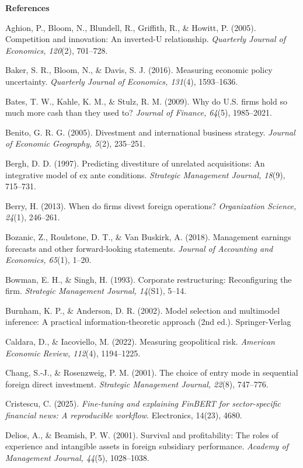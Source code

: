 \documentclass{article}
\begin{document}
\newpage

\textbf{References}

Aghion, P., Bloom, N., Blundell, R., Griffith, R., \& Howitt, P. (2005).
Competition and innovation: An inverted-U relationship. \emph{Quarterly
Journal of Economics, 120}(2), 701--728.

Baker, S. R., Bloom, N., \& Davis, S. J. (2016). Measuring economic
policy uncertainty. \emph{Quarterly Journal of Economics, 131}(4),
1593--1636.

Bates, T. W., Kahle, K. M., \& Stulz, R. M. (2009). Why do U.S. firms
hold so much more cash than they used to? \emph{Journal of Finance,
64}(5), 1985--2021.

Benito, G. R. G. (2005). Divestment and international business strategy.
\emph{Journal of Economic Geography, 5}(2), 235--251.

Bergh, D. D. (1997). Predicting divestiture of unrelated acquisitions:
An integrative model of ex ante conditions. \emph{Strategic Management
Journal, 18}(9), 715--731.

Berry, H. (2013). When do firms divest foreign operations?
\emph{Organization Science, 24}(1), 246--261.

Bozanic, Z., Roulstone, D. T., \& Van Buskirk, A. (2018). Management
earnings forecasts and other forward-looking statements. \emph{Journal
of Accounting and Economics, 65}(1), 1--20.

Bowman, E. H., \& Singh, H. (1993). Corporate restructuring:
Reconfiguring the firm. \emph{Strategic Management Journal, 14}(S1),
5--14.

Burnham, K. P., \& Anderson, D. R. (2002). Model selection and
multimodel inference: A practical information-theoretic approach (2nd
ed.). Springer-Verlag

Caldara, D., \& Iacoviello, M. (2022). Measuring geopolitical risk.
\emph{American Economic Review, 112}(4), 1194--1225.

Chang, S.-J., \& Rosenzweig, P. M. (2001). The choice of entry mode in
sequential foreign direct investment. \emph{Strategic Management
Journal, 22}(8), 747--776.

Cristescu, C. (2025). \emph{Fine-tuning and explaining FinBERT for
sector-specific financial news: A reproducible workflow}. Electronics,
14(23), 4680.

Delios, A., \& Beamish, P. W. (2001). Survival and profitability: The
roles of experience and intangible assets in foreign subsidiary
performance. \emph{Academy of Management Journal, 44}(5), 1028--1038.
\end{document}
